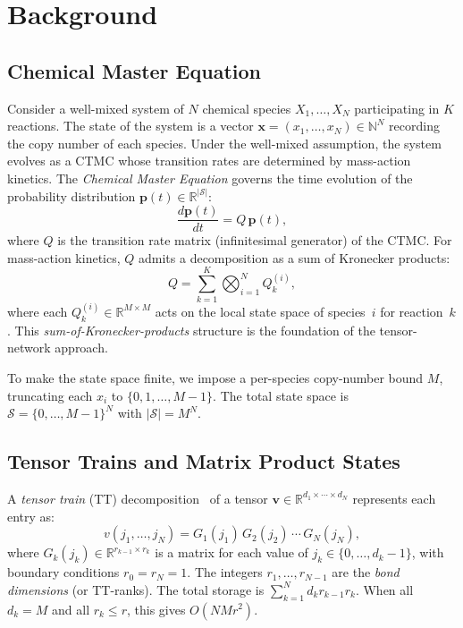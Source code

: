 \documentclass[11pt]{article}
\newcommand{\R}{\mathbb{R}}
\newcommand{\N}{\mathbb{N}}
\newcommand{\calS}{\mathcal{S}}
\begin{document}
\section{Background}\label{sec:background}

\subsection{Chemical Master Equation}\label{sec:bg:cme}

Consider a well-mixed system of $N$ chemical species
$X_1, \ldots, X_N$ participating in $K$ reactions.
The state of the system is a vector
$\mathbf{x} = (x_1, \ldots, x_N) \in \N^N$
recording the copy number of each species.
Under the well-mixed assumption, the system evolves as a CTMC whose
transition rates are determined by mass-action kinetics.
The \emph{Chemical Master Equation} governs the time evolution of
the probability distribution $\mathbf{p}(t) \in \R^{|\calS|}$:
\begin{equation}\label{eq:cme}
  \frac{d\mathbf{p}(t)}{dt} = Q\,\mathbf{p}(t),
\end{equation}
where $Q$ is the transition rate matrix (infinitesimal generator)
of the CTMC.
For mass-action kinetics, $Q$ admits a decomposition as a sum of
Kronecker products:
\begin{equation}\label{eq:kron}
  Q = \sum_{k=1}^{K} \bigotimes_{i=1}^{N} Q_k^{(i)},
\end{equation}
where each $Q_k^{(i)} \in \R^{M \times M}$ acts on the local state
space of species~$i$ for reaction~$k$.
This \emph{sum-of-Kronecker-products} structure is the foundation
of the tensor-network approach.

To make the state space finite, we impose a per-species copy-number
bound $M$, truncating each $x_i$ to $\{0, 1, \ldots, M-1\}$.
The total state space is $\calS = \{0,\ldots,M-1\}^N$ with $|\calS| = M^N$.

\subsection{Tensor Trains and Matrix Product States}\label{sec:bg:tt}

A \emph{tensor train} (TT) decomposition~\cite{oseledets2011} of a
tensor $\mathbf{v} \in \R^{d_1 \times \cdots \times d_N}$ represents
each entry as:
\begin{equation}\label{eq:tt}
  v(j_1, \ldots, j_N)
  = G_1(j_1)\, G_2(j_2)\, \cdots\, G_N(j_N),
\end{equation}
where $G_k(j_k) \in \R^{r_{k-1} \times r_k}$ is a matrix for each
value of $j_k \in \{0, \ldots, d_k - 1\}$, with boundary conditions
$r_0 = r_N = 1$.
The integers $r_1, \ldots, r_{N-1}$ are the \emph{bond dimensions}
(or TT-ranks).
The total storage is $\sum_{k=1}^{N} d_k r_{k-1} r_k$.
When all $d_k = M$ and all $r_k \leq r$, this gives $O(NMr^2)$.
\end{document}
